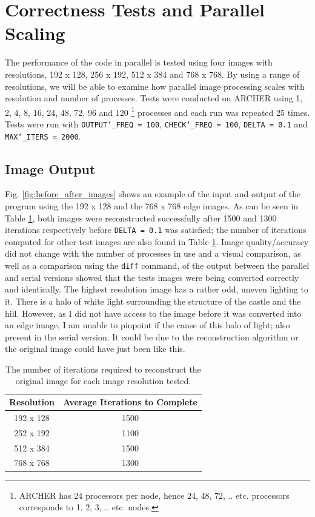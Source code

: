 \documentclass[11pt, a4paper]{article}
\begin{document}
	\section{Correctness Tests and Parallel Scaling}
		The performance of the code in parallel is tested using four images with resolutions, 192 x 128, 256 x 192, 512 x 384 and 768 x 768. By using a range of resolutions, we will be able to examine how parallel image processing scales with resolution and number of processes. Tests were conducted on ARCHER using 1, 2, 4, 8, 16, 24, 48, 72, 96 and 120 \footnote{ARCHER has 24 processors per node, hence 24, 48, 72, .. etc. processors corresponds to 1, 2, 3, .. etc. nodes.} processes and each run was repeated 25 times. Tests were run with \texttt{OUTPUT\char`_FREQ = 100}, \texttt{CHECK\char`_FREQ = 100}, \texttt{DELTA = 0.1} and \texttt{MAX\char`_ITERS = 2000}.

		\subsection{Image Output}				
			Fig. \ref{fig:before_after_images} shows an example of the input and output of the program using the 192 x 128 and the 768 x 768 edge images. As can be seen in Table \ref{tab:iterations}, both images were reconstructed successfully after 1500 and 1300 iterations respectively before \texttt{DELTA = 0.1} was satisfied; the number of iterations computed for other test images are also found in Table \ref{tab:iterations}. Image quality/accuracy did not change with the number of processes in use and a visual comparison, as well as a comparison using the \texttt{diff} command, of the output between the parallel and serial versions showed that the tests images were being converted correctly and identically. The highest resolution image has a rather odd, uneven lighting to it. There is a halo of white light surrounding the structure of the castle and the hill. However, as I did not have access to the image before it was converted into an edge image, I am unable to pinpoint if the cause of this halo of light; also present in the serial version. It could be due to the reconstruction algorithm or the original image could have just been like this.
				
			\begin{table}[]
				\centering
				\begin{tabular}{|c|c|}
					\hline
					\textbf{Resolution} & \textbf{Average Iterations to Complete} \\ \hline
					192 x 128           & 1500                                    \\
					252 x 192           & 1100                                    \\
					512 x 384           & 1500                                    \\
					768 x 768           & 1300                                    \\ \hline
				\end{tabular}
				\caption{The number of iterations required to reconstruct the original image for each image resolution tested.}
				\label{tab:iterations}
			\end{table}	
				
\end{document}
